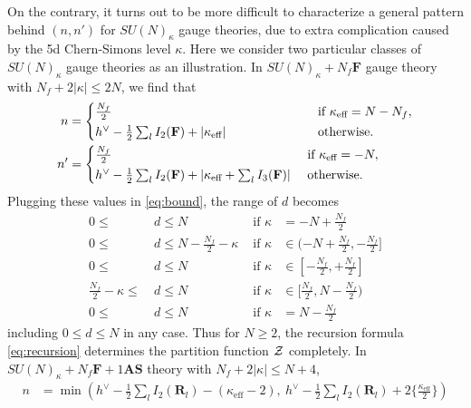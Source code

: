 \documentclass[letterpaper, 11pt]{article}
\newcommand{\nn}{\nonumber}
\def\CZ{{\cal Z}}
\def\k{\kappa}
\begin{document}
{On the contrary, it turns out to be more difficult to characterize a general pattern behind $(n, n')$ for $SU(N)_\kappa$ gauge theories, due to extra complication caused by the 5d Chern-Simons level $\kappa$. Here we consider two particular classes of $SU(N)_\kappa$ gauge theories as an illustration.  In $SU(N)_\kappa + N_f\mathbf{F}$ gauge theory with $N_f + 2|\kappa| \leq 2N$, we find that 
\begin{align}
  \label{eq:sun-nf}
  n &= \begin{dcases}
  \textstyle \frac{N_f}{2}
  & \hspace{2.1cm} \textstyle\text{ if }  \kappa_\text{eff} = N - N_f, \\
  \textstyle h^\vee - \frac{1}{2} \sum_{l}I_2(\mathbf{F}) + |\k_\text{eff}| 
  & \hspace{2.1cm}\textstyle\text{ otherwise}.
  \end{dcases}\\
  n' &=
    \begin{dcases}
     \textstyle \frac{N_f}{2}
    &  \textstyle\text{ if }  \kappa_\text{eff} = -N, \\
    \textstyle h^\vee - \frac{1}{2} \sum_{l}I_2(\mathbf{F}) + \left|\k_\text{eff} + \sum_{l}I_3(\mathbf{F})\right| 
    &  \textstyle\text{ otherwise} \nn.
    \end{dcases}  
\end{align}
Plugging these values in \eqref{eq:bound}, the range of $d$ becomes
\begin{align}
  \label{eq:sun-nf-range}
  0 \leq &\ d \leq N &\text{ if } \kappa &= -N + \tfrac{N_f}{2} \nn \\
  0 \leq &\ d \leq N-\tfrac{N_f}{2}-\kappa &\text{ if } \kappa & \in (-N +\tfrac{N_f}{2}, -\tfrac{N_f}{2}] \nn \\
  0 \leq &\ d \leq N &\text{ if } \kappa &\in [-\tfrac{N_f}{2}, +\tfrac{N_f}{2}] \\
  \tfrac{N_f}{2}-\kappa \leq &\ d \leq N & \text{ if } \kappa &\in [\tfrac{N_f}{2}, N -\tfrac{N_f}{2})  \nn \\
  0 \leq &\ d \leq N & \text{ if } \kappa &= N -\tfrac{N_f}{2}  \nn 
\end{align}
including $0 \leq d \leq N$ in any case. Thus for $N\geq 2$,  the recursion formula \eqref{eq:recursion} determines the partition function $\CZ$ completely.
In $SU(N)_\kappa + N_f\mathbf{F} + 1\mathbf{AS}$  theory with $N_f + 2|\kappa| \leq N+4$, 
\begin{align}
  n &= \min \textstyle 
  \left(h^\vee - \frac{1}{2} \sum_{l}I_2(\mathbf{R}_l) - (\k_\text{eff}-2),\ h^\vee - \frac{1}{2} \sum_{l}I_2(\mathbf{R}_l) + 2\{\frac{\k_\text{eff}}{2}\}\right)\nn \\

\end{align}}
\end{document}
